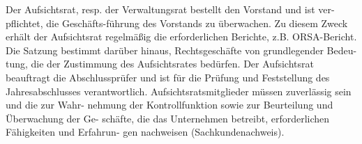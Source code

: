 Der Aufsichtsrat, resp. der Verwaltungsrat bestellt den Vorstand und ist ver-
pflichtet, die Geschäfts-führung des Vorstands zu überwachen. Zu diesem Zweck
erhält der Aufsichtsrat regelmäßig die erforderlichen Berichte, z.B. ORSA-Bericht.
Die Satzung bestimmt darüber hinaus, Rechtsgeschäfte von grundlegender Bedeu-
tung, die der Zustimmung des Aufsichtsrates bedürfen. Der Aufsichtsrat beauftragt
die Abschlussprüfer und ist für die Prüfung und Feststellung des Jahresabschlusses
verantwortlich. Aufsichtsratsmitglieder müssen zuverlässig sein und die zur Wahr-
nehmung der Kontrollfunktion sowie zur Beurteilung und Überwachung der Ge-
schäfte, die das Unternehmen betreibt, erforderlichen Fähigkeiten und Erfahrun-
gen nachweisen (Sachkundenachweis).
